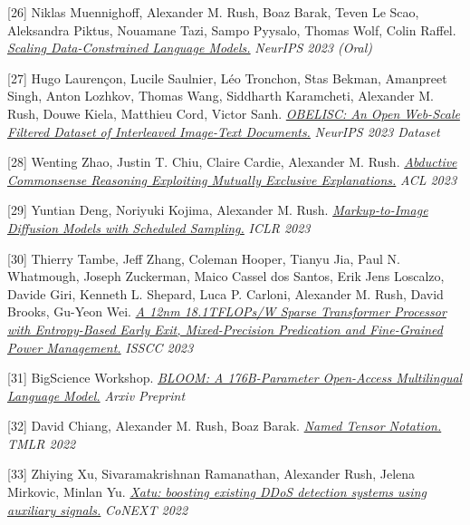 \documentclass[10pt]{article}
\begin{document}
\medskip


[26] \ind Niklas Muennighoff, Alexander M. Rush, Boaz Barak, Teven Le Scao, Aleksandra Piktus, Nouamane Tazi, Sampo Pyysalo, Thomas Wolf, Colin Raffel. \emph{\href{ https://arxiv.org/pdf/2305.16264.pdf }{ Scaling Data-Constrained Language Models.} }\emph{ NeurIPS 2023 (Oral) }

\medskip


[27] \ind Hugo Laurençon, Lucile Saulnier, Léo Tronchon, Stas Bekman, Amanpreet Singh, Anton Lozhkov, Thomas Wang, Siddharth Karamcheti, Alexander M. Rush, Douwe Kiela, Matthieu Cord, Victor Sanh. \emph{\href{ https://arxiv.org/pdf/2306.16527.pdf }{ OBELISC: An Open Web-Scale Filtered Dataset of Interleaved Image-Text Documents.} }\emph{ NeurIPS 2023 Dataset }

\medskip


[28] \ind Wenting Zhao, Justin T. Chiu, Claire Cardie, Alexander M. Rush. \emph{\href{ https://arxiv.org/pdf/2305.14618.pdf }{ Abductive Commonsense Reasoning Exploiting Mutually Exclusive Explanations.} }\emph{ ACL 2023 }

\medskip


[29] \ind Yuntian Deng, Noriyuki Kojima, Alexander M. Rush. \emph{\href{ https://arxiv.org/abs/2210.05147 }{ Markup-to-Image Diffusion Models with Scheduled Sampling.} }\emph{ ICLR 2023 }

\medskip


[30] \ind Thierry Tambe, Jeff Zhang, Coleman Hooper, Tianyu Jia, Paul N. Whatmough, Joseph Zuckerman, Maico Cassel dos Santos, Erik Jens Loscalzo, Davide Giri, Kenneth L. Shepard, Luca P. Carloni, Alexander M. Rush, David Brooks, Gu-Yeon Wei. \emph{\href{ None }{ A 12nm 18.1TFLOPs/W Sparse Transformer Processor with Entropy-Based Early Exit, Mixed-Precision Predication and Fine-Grained Power Management.} }\emph{ ISSCC 2023 }

\medskip


[31] \ind BigScience Workshop. \emph{\href{ https://arxiv.org/abs/2211.05100 }{ BLOOM: A 176B-Parameter Open-Access Multilingual Language Model.} }\emph{ Arxiv Preprint }

\medskip


[32] \ind David Chiang, Alexander M. Rush, Boaz Barak. \emph{\href{ https://arxiv.org/pdf/2102.13196.pdf }{ Named Tensor Notation.} }\emph{ TMLR 2022 }

\medskip


[33] \ind Zhiying Xu, Sivaramakrishnan Ramanathan, Alexander Rush, Jelena Mirkovic, Minlan Yu. \emph{\href{ https://dl.acm.org/doi/abs/10.1145/3555050.3569121 }{ Xatu: boosting existing DDoS detection systems using auxiliary signals.} }\emph{ CoNEXT 2022 }
\end{document}
